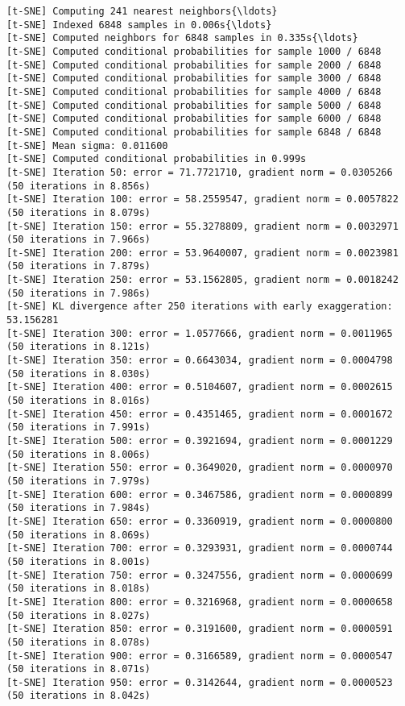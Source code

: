 \documentclass[11pt]{article}
\begin{document}
    \begin{Verbatim}[commandchars=\\\{\}]
[t-SNE] Computing 241 nearest neighbors{\ldots}
[t-SNE] Indexed 6848 samples in 0.006s{\ldots}
[t-SNE] Computed neighbors for 6848 samples in 0.335s{\ldots}
[t-SNE] Computed conditional probabilities for sample 1000 / 6848
[t-SNE] Computed conditional probabilities for sample 2000 / 6848
[t-SNE] Computed conditional probabilities for sample 3000 / 6848
[t-SNE] Computed conditional probabilities for sample 4000 / 6848
[t-SNE] Computed conditional probabilities for sample 5000 / 6848
[t-SNE] Computed conditional probabilities for sample 6000 / 6848
[t-SNE] Computed conditional probabilities for sample 6848 / 6848
[t-SNE] Mean sigma: 0.011600
[t-SNE] Computed conditional probabilities in 0.999s
[t-SNE] Iteration 50: error = 71.7721710, gradient norm = 0.0305266 (50 iterations in 8.856s)
[t-SNE] Iteration 100: error = 58.2559547, gradient norm = 0.0057822 (50 iterations in 8.079s)
[t-SNE] Iteration 150: error = 55.3278809, gradient norm = 0.0032971 (50 iterations in 7.966s)
[t-SNE] Iteration 200: error = 53.9640007, gradient norm = 0.0023981 (50 iterations in 7.879s)
[t-SNE] Iteration 250: error = 53.1562805, gradient norm = 0.0018242 (50 iterations in 7.986s)
[t-SNE] KL divergence after 250 iterations with early exaggeration: 53.156281
[t-SNE] Iteration 300: error = 1.0577666, gradient norm = 0.0011965 (50 iterations in 8.121s)
[t-SNE] Iteration 350: error = 0.6643034, gradient norm = 0.0004798 (50 iterations in 8.030s)
[t-SNE] Iteration 400: error = 0.5104607, gradient norm = 0.0002615 (50 iterations in 8.016s)
[t-SNE] Iteration 450: error = 0.4351465, gradient norm = 0.0001672 (50 iterations in 7.991s)
[t-SNE] Iteration 500: error = 0.3921694, gradient norm = 0.0001229 (50 iterations in 8.006s)
[t-SNE] Iteration 550: error = 0.3649020, gradient norm = 0.0000970 (50 iterations in 7.979s)
[t-SNE] Iteration 600: error = 0.3467586, gradient norm = 0.0000899 (50 iterations in 7.984s)
[t-SNE] Iteration 650: error = 0.3360919, gradient norm = 0.0000800 (50 iterations in 8.069s)
[t-SNE] Iteration 700: error = 0.3293931, gradient norm = 0.0000744 (50 iterations in 8.001s)
[t-SNE] Iteration 750: error = 0.3247556, gradient norm = 0.0000699 (50 iterations in 8.018s)
[t-SNE] Iteration 800: error = 0.3216968, gradient norm = 0.0000658 (50 iterations in 8.027s)
[t-SNE] Iteration 850: error = 0.3191600, gradient norm = 0.0000591 (50 iterations in 8.078s)
[t-SNE] Iteration 900: error = 0.3166589, gradient norm = 0.0000547 (50 iterations in 8.071s)
[t-SNE] Iteration 950: error = 0.3142644, gradient norm = 0.0000523 (50 iterations in 8.042s)

\end{Verbatim}
\end{document}
